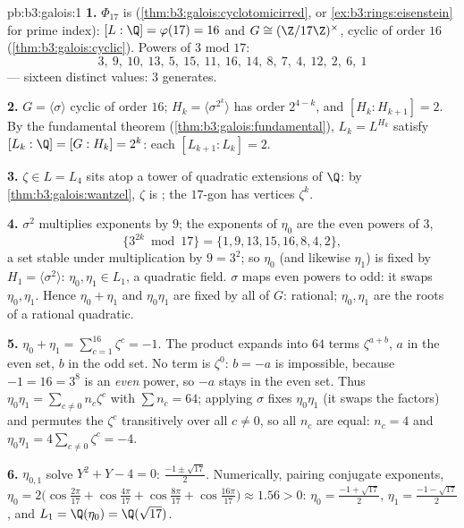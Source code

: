 \begin{solution}{pb:b3:galois:1}
\textbf{1.} $\Phi_{17}$ is 
(\cref{thm:b3:galois:cyclotomicirred}, or
\cref{ex:b3:rings:eisenstein} for prime index): $[L:\Q] =
\varphi(17) = 16$ and $G \cong (\Z/17\Z)^\times$, cyclic of
order $16$ (\cref{thm:b3:galois:cyclic}). Powers of $3$ mod
$17$:
\[
3,\ 9,\ 10,\ 13,\ 5,\ 15,\ 11,\ 16,\ 14,\ 8,\ 7,\ 4,\ 12,\ 2,\
6,\ 1
\]
--- sixteen distinct values: $3$ generates.

\textbf{2.} $G = \langle\sigma\rangle$ cyclic of order $16$;
$H_k = \langle\sigma^{2^k}\rangle$ has order $2^{4-k}$, and
$[H_k : H_{k+1}] = 2$. By the fundamental theorem
(\cref{thm:b3:galois:fundamental}), $L_k = L^{H_k}$ satisfy
$[L_k : \Q] = [G : H_k] = 2^k$: each $[L_{k+1}:L_k] = 2$.

\textbf{3.} $\zeta \in L = L_4$ sits atop a tower of quadratic
extensions of $\Q$: by \cref{thm:b3:galois:wantzel}, $\zeta$ is
; the $17$-gon has vertices $\zeta^k$.

\textbf{4.} $\sigma^2$ multiplies exponents by $9$; the
exponents of $\eta_0$ are the even powers of $3$,
\[
\{3^{2k} \bmod 17\} = \{1, 9, 13, 15, 16, 8, 4, 2\},
\]
a set stable under multiplication by $9 = 3^2$; so $\eta_0$
(and likewise $\eta_1$) is fixed by $H_1 =
\langle\sigma^2\rangle$: $\eta_0, \eta_1 \in L_1$, a quadratic
field. $\sigma$ maps even powers to odd: it swaps $\eta_0,
\eta_1$. Hence $\eta_0 + \eta_1$ and $\eta_0\eta_1$ are fixed by
all of $G$: rational; $\eta_0, \eta_1$ are the roots of a
rational quadratic.

\textbf{5.} $\eta_0 + \eta_1 = \sum_{c=1}^{16}\zeta^c = -1$. The
product expands into $64$ terms $\zeta^{a + b}$, $a$ in the even
set, $b$ in the odd set. No term is $\zeta^0$: $b = -a$ is
impossible, because $-1 = 16 = 3^8$ is an \emph{even} power, so
$-a$ stays in the even set. Thus $\eta_0\eta_1 = \sum_{c \neq 0}
n_c\zeta^c$ with $\sum n_c = 64$; applying $\sigma$ fixes
$\eta_0\eta_1$ (it swaps the factors) and permutes the $\zeta^c$
transitively over all $c \neq 0$, so all $n_c$ are equal: $n_c
= 4$ and $\eta_0\eta_1 = 4\sum_{c\neq0}\zeta^c = -4$.

\textbf{6.} $\eta_{0,1}$ solve $Y^2 + Y - 4 = 0$: $\frac{-1 \pm
\sqrt{17}}2$. Numerically, pairing conjugate exponents,
$\eta_0 = 2\bigl(\cos\tfrac{2\pi}{17} + \cos\tfrac{4\pi}{17} +
\cos\tfrac{8\pi}{17} + \cos\tfrac{16\pi}{17}\bigr) \approx 1.56
> 0$: $\eta_0 = \frac{-1+\sqrt{17}}2$, $\eta_1 =
\frac{-1-\sqrt{17}}2$, and $L_1 = \Q(\eta_0) = \Q(\sqrt{17})$.


\end{solution}
